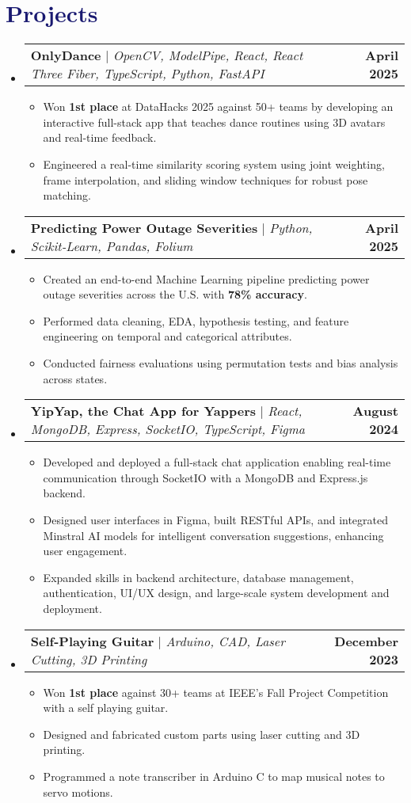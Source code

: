 \documentclass[letterpaper,11pt]{article}
\makeatletter
\newcommand{\resumeItem}[1]{
  \item\small{
    {#1 \vspace{-2pt}}
  }
}
\newcommand{\resumeProjectHeading}[2]{
    \item
    \begin{tabular*}{1.001\textwidth}{l@{\extracolsep{\fill}}r}
      \small#1 & \textbf{\small #2}\\
    \end{tabular*}\vspace{-7pt}
}
\newcommand{\resumeSubHeadingListStart}{\begin{itemize}[leftmargin=0.0in, label={}]}
\newcommand{\resumeSubHeadingListEnd}{\end{itemize}}
\newcommand{\resumeItemListStart}{\begin{itemize}}
\newcommand{\resumeItemListEnd}{\end{itemize}\vspace{-5pt}}
\newcommand\accentColor{MidnightBlue}
\makeatother
\begin{document}
\section{\textcolor{\accentColor}{Projects}}
\resumeSubHeadingListStart
\resumeProjectHeading
    {\textbf{OnlyDance} $|$ \emph{OpenCV, ModelPipe, React, React Three Fiber, TypeScript, Python, FastAPI}}{April 2025}
    \resumeItemListStart
        \resumeItem{Won \textbf{1st place} at DataHacks 2025 against 50+ teams by developing an interactive full-stack app that teaches dance routines using 3D avatars and real-time feedback.}
        \resumeItem{Engineered a real-time similarity scoring system using joint weighting, frame interpolation, and sliding window techniques for robust pose matching.}
    \resumeItemListEnd
\vspace{-15pt}
\resumeProjectHeading
    {\textbf{Predicting Power Outage Severities} $|$ \emph{Python, Scikit-Learn, Pandas, Folium}}{April 2025}
    \resumeItemListStart
        \resumeItem{Created an end-to-end Machine Learning pipeline predicting power outage severities across the U.S. with \textbf{78\% accuracy}.}
        \resumeItem{Performed data cleaning, EDA, hypothesis testing, and feature engineering on temporal and categorical attributes.}
        \resumeItem{Conducted fairness evaluations using permutation tests and bias analysis across states.}
    \resumeItemListEnd
\vspace{-15pt}
\resumeProjectHeading
    {\textbf{YipYap, the Chat App for Yappers} $|$ \emph{React, MongoDB, Express, SocketIO, TypeScript, Figma}}{August 2024}
    \resumeItemListStart
        \resumeItem{Developed and deployed a full-stack chat application enabling real-time communication through SocketIO with a MongoDB and Express.js backend.}
        \resumeItem{Designed user interfaces in Figma, built RESTful APIs, and integrated Minstral AI models for intelligent conversation suggestions, enhancing user engagement.}
        \resumeItem{Expanded skills in backend architecture, database management, authentication, UI/UX design, and large-scale system development and deployment.}
    \resumeItemListEnd
\vspace{-15pt}
\resumeProjectHeading
    {\textbf{Self-Playing Guitar} $|$ \emph{Arduino, CAD, Laser Cutting, 3D Printing}}{December 2023}
    \resumeItemListStart
        \resumeItem{Won \textbf{1st place} against 30+ teams at IEEE's Fall Project Competition with a self playing guitar.}
        \resumeItem{Designed and fabricated custom parts using laser cutting and 3D printing.}
        \resumeItem{Programmed a note transcriber in Arduino C to map musical notes to servo motions.}
    \resumeItemListEnd
\resumeSubHeadingListEnd
\vspace{-15pt}
\end{document}
